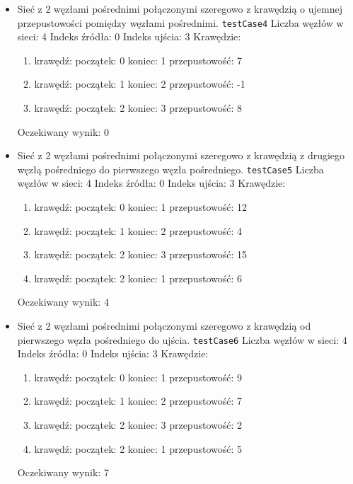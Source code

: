 \begin{itemize}[nosep]
    \item Sieć z 2 węzłami pośrednimi połączonymi szeregowo z krawędzią o
    ujemnej przepustowości pomiędzy węzłami pośrednimi.
    \texttt{testCase4}
    Liczba węzłów w sieci: 4
    Indeks źródła: 0
    Indeks ujścia: 3
    Krawędzie:
    \begin{enumerate}[nosep]
        \item krawędź:
        początek: 0
        koniec: 1
        przepustowość: 7
        \item krawędź:
        początek: 1
        koniec: 2
        przepustowość: -1
        \item krawędź:
        początek: 2
        koniec: 3
        przepustowość: 8
    \end{enumerate}
    Oczekiwany wynik: 0

    \item Sieć z 2 węzłami pośrednimi połączonymi szeregowo z krawędzią z
    drugiego węzłą pośredniego do pierwszego węzła pośredniego.
    \texttt{testCase5}
    Liczba węzłów w sieci: 4
    Indeks źródła: 0
    Indeks ujścia: 3
    Krawędzie:
    \begin{enumerate}[nosep]
        \item krawędź:
        początek: 0
        koniec: 1
        przepustowość: 12
        \item krawędź:
        początek: 1
        koniec: 2
        przepustowość: 4
        \item krawędź:
        początek: 2
        koniec: 3
        przepustowość: 15
        \item krawędź:
        początek: 2
        koniec: 1
        przepustowość: 6
    \end{enumerate}
    Oczekiwany wynik: 4

    \item Sieć z 2 węzłami pośrednimi połączonymi szeregowo z krawędzią od
    pierwszego węzła pośredniego do ujścia.
    \texttt{testCase6}
    Liczba węzłów w sieci: 4
    Indeks źródła: 0
    Indeks ujścia: 3
    Krawędzie:
    \begin{enumerate}[nosep]
        \item krawędź:
        początek: 0
        koniec: 1
        przepustowość: 9
        \item krawędź:
        początek: 1
        koniec: 2
        przepustowość: 7
        \item krawędź:
        początek: 2
        koniec: 3
        przepustowość: 2
        \item krawędź:
        początek: 2
        koniec: 1
        przepustowość: 5
    \end{enumerate}
    Oczekiwany wynik: 7


\end{itemize}
